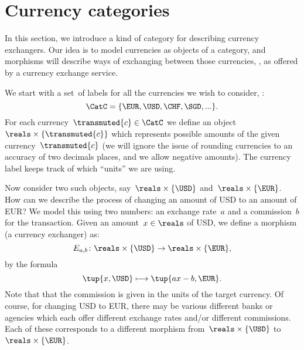 \section{Currency categories}
\label{sec:currency_cat}
In this section, we introduce a kind of category for describing currency exchangers. Our idea is to model currencies as objects of a category, and morphisms will describe ways of exchanging between those currencies, , as offered by a currency exchange service.

We start with a set~\CatC of labels for all the currencies we wish to consider, :
\begin{equation*}
    \CatC = \{ \EUR, \USD, \CHF, \SGD, ... \}.
\end{equation*}
For each currency~$\transmuted{c} \in \CatC$ we define an object~$\reals \times \{\transmuted{c}\}$ which represents possible amounts of the given currency~$\transmuted{c}$ (we will ignore the issue of rounding currencies to an accuracy of two decimals places, and we allow negative amounts). The currency label keeps track of which ``units'' we are using.

Now consider two such objects, say~$\reals \times \{\USD\}$ and~$\reals \times \{\EUR\}$. How can we describe the process of changing an amount of USD to an amount of EUR? We model this using two numbers: an exchange rate~$a$ and a commission~$b$ for the transaction. Given an amount~$x \in \reals$ of USD, we define a morphism (a currency exchanger) as:
\begin{equation*}
    E_{a,b} \colon \reals \times \{\USD\} \rightarrow \reals \times \{\EUR\},
\end{equation*}
by the formula
\begin{equation*}
    \tup{x, \USD} \longmapsto \tup{ax - b, \EUR}.
\end{equation*}
Note that that the commission is given in the units of the target currency. Of course, for changing USD to EUR, there may be various different banks or agencies which each offer different exchange rates and/or different commissions. Each of these corresponds to a different morphism from~$\reals \times \{\USD\}$ to~$\reals \times \{\EUR\}$.

